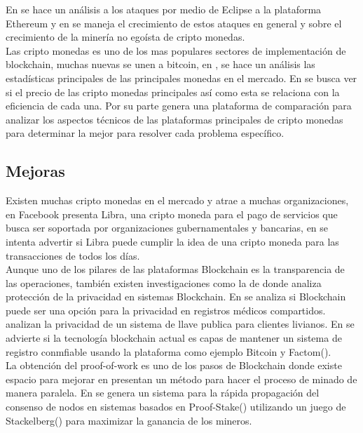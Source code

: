 \documentclass[10pt,letterpaper]{article}
\begin{document}
En \cite{wust2016ethereum} se hace un análisis a los ataques por medio de Eclipse a la plataforma Ethereum y en \cite{nayak2016stubborn} se maneja el crecimiento de estos ataques en general y sobre el crecimiento de la minería no egoísta de cripto monedas.\\

Las cripto monedas es uno de los mas populares sectores de implementación de blockchain, muchas nuevas se unen a bitcoin\cite{nakamoto2008bitcoin}, en \cite{chan2017statistical}, se hace un análisis las estadísticas principales de las principales monedas en el mercado. En \cite{kyriazis2019survey} se busca ver si el precio de las cripto monedas principales así como esta se relaciona con la eficiencia de cada una. Por su parte \cite{ivanov2018technical} genera una plataforma de comparación para analizar los aspectos técnicos de las plataformas principales de cripto monedas para determinar la mejor para resolver cada problema específico.\\



\subsection{Mejoras}

Existen muchas cripto monedas en el mercado y atrae a muchas organizaciones, en \cite{libra2019} Facebook presenta Libra, una cripto moneda para el pago de servicios que busca ser soportada por organizaciones gubernamentales y bancarias, en \cite{taskinsoy2019facebook} se intenta advertir si Libra puede cumplir la idea de una cripto moneda para las transacciones de todos los días.\\ 

Aunque uno de los pilares de las plataformas Blockchain es la transparencia de las operaciones, también existen investigaciones como la de \cite{feng2019survey} donde analiza protección de la privacidad en sistemas Blockchain. En \cite{esposito2018blockchain} se analiza si Blockchain puede ser una opción para la privacidad en registros médicos compartidos. \cite{jiang2019ptas} analizan la privacidad de un sistema de llave publica para clientes livianos. En \cite{lemieux2016trusting}se advierte si la tecnología blockchain actual es capas de mantener un sistema de registro conmfiable usando la plataforma como ejemplo Bitcoin y Factom(\cite{snow2015factom}).\\ 

La obtención del proof-of-work es uno de los pasos de Blockchain donde existe espacio para mejorar en  \cite{hazari2019parallel} presentan un método para hacer el proceso de minado de manera paralela. En \cite{kang2018incentivizing} se genera un sistema para la rápida propagación del consenso de nodos en sistemas basados en Proof-Stake(\cite{kiayias2017ouroboros}) utilizando un juego de Stackelberg(\cite{zhang2009stackelberg}) para maximizar la ganancia de los mineros. \\
\end{document}
